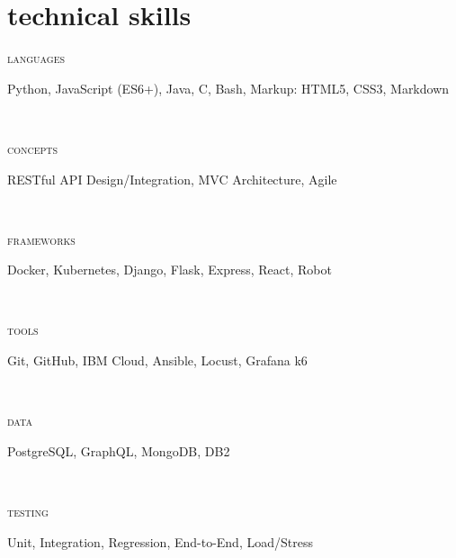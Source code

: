 \documentclass[letterpaper, 11pt]{article}
\newcommand{\skillentry}[2]{
    \begin{minipage}[t]{.15\linewidth}
        \hfill \textsc{#1}
        \end{minipage}
        \hfill\vline\hfill
        \begin{minipage}[t]{.80\linewidth}
        \small{#2}
        \end{minipage}\\
    }
\begin{document}
    \section{technical skills}
    \skillentry{languages}{Python, JavaScript (ES6+), Java, C, Bash, Markup: HTML5, CSS3, Markdown}
    \skillentry{concepts}{RESTful API Design/Integration, MVC Architecture, Agile}
    \skillentry{frameworks}{Docker, Kubernetes, Django, Flask, Express, React, Robot}
    \skillentry{tools}{Git, GitHub, IBM Cloud, Ansible, Locust, Grafana k6}
    \skillentry{data}{PostgreSQL, GraphQL, MongoDB, DB2}
    \skillentry{testing}{Unit, Integration, Regression, End-to-End, Load/Stress}
\end{document}
